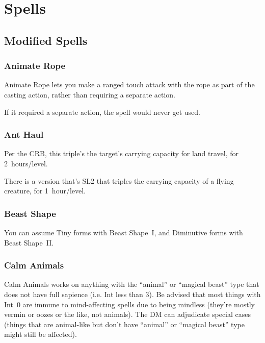 
\chapter{Spells}
\label{sect-spells}

%
%
\section{Modified Spells}

%
\subsection{Animate Rope}

Animate Rope lets you make a ranged touch attack with the rope as part of
the casting action, rather than requiring a separate action.

If it required a separate action, the spell would never get used.
%

%
\subsection{Ant Haul}

Per the CRB, this triple's the target's carrying capacity for land travel,
for 2~hours/level.

There is a version that's SL2 that triples the carrying capacity of a
flying creature, for 1~hour/level.
%

%
\subsection{Beast Shape}

You can assume Tiny forms with Beast Shape~I, and Diminutive forms with
Beast Shape~II.
%

%
\subsection{Calm Animals}

Calm Animals works on anything with the ``animal'' or ``magical beast''
type that does not have full sapience (i.e. Int less than 3). Be advised
that most things with Int~0 are immune to mind-affecting spells due to
being mindless (they're mostly vermin or oozes or the like, not animals).
The DM can adjudicate special cases (things that are animal-like but don't
have ``animal'' or ``magical beast'' type might still be affected).
%

